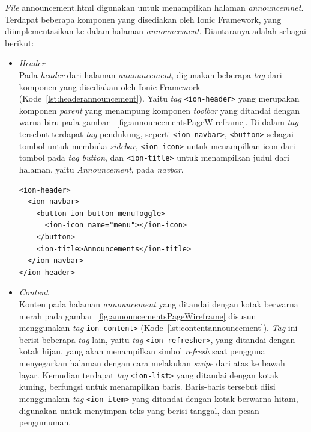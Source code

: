 \begin{enumerate}
	\textit{File} announcement.html digunakan untuk menampilkan halaman \textit{announcemnet}. Terdapat beberapa komponen yang disediakan oleh Ionic Framework, yang diimplementasikan ke dalam halaman \textit{announcement}. Diantaranya adalah sebagai berikut:	
	
	\begin{itemize}
		\item \textit{Header} \\
		Pada \textit{header} dari halaman \textit{announcement}, digunakan beberapa \textit{tag} dari komponen yang disediakan oleh Ionic Framework (Kode~\ref{lst:headerannouncement}). Yaitu \textit{tag} \texttt{<ion-header>} yang merupakan komponen \textit{parent} yang menampung komponen \textit{toolbar} yang ditandai dengan warna biru pada gambar ~\ref{fig:announcementsPageWireframe}. Di dalam \textit{tag} tersebut terdapat \textit{tag} pendukung, seperti \texttt{<ion-navbar>}, \texttt{<button>} sebagai tombol untuk membuka \textit{sidebar}, \texttt{<ion-icon>} untuk menampilkan icon dari tombol pada \textit{tag button}, dan \texttt{<ion-title>} untuk menampilkan judul dari halaman, yaitu \textit{Announcement}, pada \textit{navbar}.
\begin{lstlisting}[label={lst:headerannouncement}, caption=\textit{Header} pada Halaman \textit{Annoncement}]
<ion-header>
  <ion-navbar>
    <button ion-button menuToggle>
      <ion-icon name="menu"></ion-icon>
    </button>
    <ion-title>Announcements</ion-title>
  </ion-navbar>
</ion-header>
\end{lstlisting} 

		\item \textit{Content} \\
		Konten pada halaman \textit{announcement} yang ditandai dengan kotak berwarna merah pada gambar~\ref{fig:announcementsPageWireframe} disusun menggunakan \textit{tag} \texttt{ion-content>} (Kode~\ref{lst:contentannouncement}). \textit{Tag} ini berisi beberapa \textit{tag} lain, yaitu \textit{tag} \texttt{<ion-refresher>}, yang ditandai dengan kotak hijau, yang akan menampilkan simbol \textit{refresh} saat pengguna menyegarkan halaman dengan cara melakukan \textit{swipe} dari atas ke bawah layar. Kemudian terdapat \textit{tag} \texttt{<ion-list>} yang ditandai dengan kotak kuning, berfungsi untuk menampilkan baris. Baris-baris tersebut diisi menggunakan \textit{tag} \texttt{<ion-item>} yang ditandai dengan kotak berwarna hitam, digunakan untuk menyimpan teks yang berisi tanggal, dan pesan pengumuman.


\end{itemize}
\end{enumerate}
